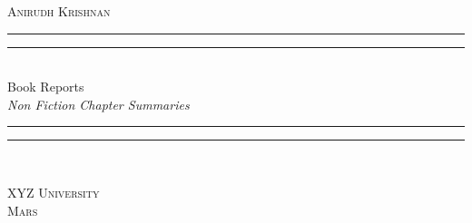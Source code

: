 
\begin{titlepage}
\centering
	\settowidth{\unitlength}{\LARGE THE BOOK OF CONUNDRUMS}
	\vspace*{\baselineskip}
	{\large\scshape Anirudh Krishnan}\\[\baselineskip]
	\rule{\unitlength}{1.6pt}\vspace*{-\baselineskip}\vspace*{2pt}
	\rule{\unitlength}{0.4pt}\\[\baselineskip]
	{\LARGE Book Reports}\\[\baselineskip]
	{\itshape Non Fiction Chapter Summaries}\\[0.2\baselineskip]
	\rule{\unitlength}{0.4pt}\vspace*{-\baselineskip}\vspace{3.2pt}
	\rule{\unitlength}{1.6pt}\\[\baselineskip]
	\par
	\vfill
	{\large\scshape XYZ University}\\[\baselineskip]
	{\small\scshape Mars}\par
	\vspace*{0.1\textheight}
\end{titlepage}

\restoregeometry
